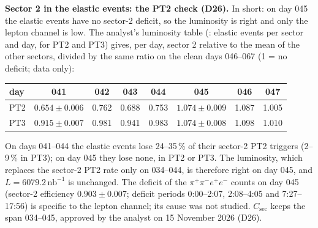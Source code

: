 \documentclass[11pt,a4paper]{article}
\newcommand{\ppee}{\ensuremath{\pi^{+}\pi^{-}e^{+}e^{-}}\xspace}
\newcommand{\nbinv}{\ensuremath{\mathrm{nb}^{-1}}\xspace}
\newcommand{\code}[1]{\texttt{\detokenize{#1}}}
\newcommand{\Csec}{\ensuremath{C_{\mathrm{sec}}}\xspace}
\begin{document}
\textbf{Sector 2 in the elastic events: the PT2 check (D26).} In short: on day 045 the elastic events have no sector-2 deficit, so the
luminosity is right and only the lepton channel is low. The analyst's luminosity table (\code{s2_trigger_perday.csv}: elastic events per sector
and day, for PT2 and PT3) gives, per day, sector 2 relative to the mean of the other sectors, divided by the same ratio on the clean days 046--067
(1 = no deficit; data only):
\begin{center}\small
\begin{tabular}{@{}l c c c c c c c@{}}
\toprule
day & 041 & 042 & 043 & 044 & 045 & 046 & 047 \\
\midrule
PT2 & $0.654\pm0.006$ & 0.762 & 0.688 & 0.753 & $1.074\pm0.009$ & 1.087 & 1.005 \\
PT3 & $0.915\pm0.007$ & 0.981 & 0.941 & 0.983 & $1.074\pm0.008$ & 1.098 & 1.010 \\
\bottomrule
\end{tabular}
\end{center}
On days 041--044 the elastic events lose 24--35\,\% of their sector-2 PT2 triggers (2--9\,\% in PT3); on day 045 they lose none, in PT2 or PT3. The
luminosity, which replaces the sector-2 PT2 rate only on 034--044, is therefore right on day 045, and $L=6079.2\,\nbinv$ is unchanged. The deficit
of the \ppee counts on day 045 (sector-2 efficiency $0.903\pm0.007$; deficit periods 0:00--2:07, 2:08--4:05 and 7:27--17:56) is specific to the
lepton channel; its cause was not studied. \Csec keeps the span 034--045, approved by the analyst on 15 November 2026 (D26).
\end{document}
